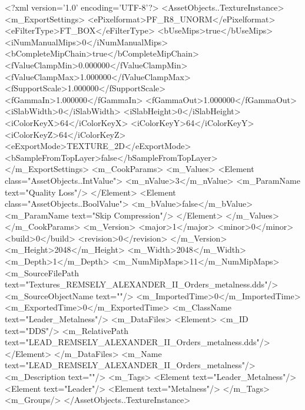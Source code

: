 <?xml version='1.0' encoding='UTF-8'?>
<AssetObjects..TextureInstance>
  <m_ExportSettings>
    <ePixelformat>PF_R8_UNORM</ePixelformat>
    <eFilterType>FT_BOX</eFilterType>
    <bUseMips>true</bUseMips>
    <iNumManualMips>0</iNumManualMips>
    <bCompleteMipChain>true</bCompleteMipChain>
    <fValueClampMin>0.000000</fValueClampMin>
    <fValueClampMax>1.000000</fValueClampMax>
    <fSupportScale>1.000000</fSupportScale>
    <fGammaIn>1.000000</fGammaIn>
    <fGammaOut>1.000000</fGammaOut>
    <iSlabWidth>0</iSlabWidth>
    <iSlabHeight>0</iSlabHeight>
    <iColorKeyX>64</iColorKeyX>
    <iColorKeyY>64</iColorKeyY>
    <iColorKeyZ>64</iColorKeyZ>
    <eExportMode>TEXTURE_2D</eExportMode>
    <bSampleFromTopLayer>false</bSampleFromTopLayer>
  </m_ExportSettings>
  <m_CookParams>
    <m_Values>
      <Element class="AssetObjects..IntValue">
        <m_nValue>3</m_nValue>
        <m_ParamName text="Quality Loss"/>
      </Element>
      <Element class="AssetObjects..BoolValue">
        <m_bValue>false</m_bValue>
        <m_ParamName text="Skip Compression"/>
      </Element>
    </m_Values>
  </m_CookParams>
  <m_Version>
    <major>1</major>
    <minor>0</minor>
    <build>0</build>
    <revision>0</revision>
  </m_Version>
  <m_Height>2048</m_Height>
  <m_Width>2048</m_Width>
  <m_Depth>1</m_Depth>
  <m_NumMipMaps>11</m_NumMipMaps>
  <m_SourceFilePath text="Textures\LEAD_REMSELY_ALEXANDER_II_Orders_metalness.dds"/>
  <m_SourceObjectName text=""/>
  <m_ImportedTime>0</m_ImportedTime>
  <m_ExportedTime>0</m_ExportedTime>
  <m_ClassName text="Leader_Metalness"/>
  <m_DataFiles>
    <Element>
      <m_ID text="DDS"/>
      <m_RelativePath text="LEAD_REMSELY_ALEXANDER_II_Orders_metalness.dds"/>
    </Element>
  </m_DataFiles>
  <m_Name text="LEAD_REMSELY_ALEXANDER_II_Orders_metalness"/>
  <m_Description text=""/>
  <m_Tags>
    <Element text="Leader_Metalness"/>
    <Element text="Leader"/>
    <Element text="Metalness"/>
  </m_Tags>
  <m_Groups/>
</AssetObjects..TextureInstance>
